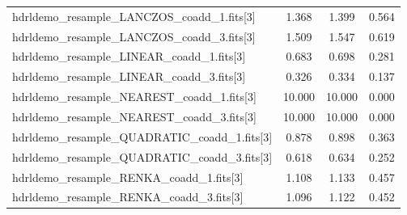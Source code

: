 \begin{table}[H]
\begin{center}
\begin{tabular}{|l|c|c|c|}
hdrldemo\_resample\_LANCZOS\_coadd\_1.fits[3]              & 1.368       & 1.399      & 0.564         \\
hdrldemo\_resample\_LANCZOS\_coadd\_3.fits[3]              & 1.509       & 1.547      & 0.619         \\
hdrldemo\_resample\_LINEAR\_coadd\_1.fits[3]               & 0.683       & 0.698      & 0.281         \\
hdrldemo\_resample\_LINEAR\_coadd\_3.fits[3]               & 0.326       &0.334      & 0.137         \\
hdrldemo\_resample\_NEAREST\_coadd\_1.fits[3]              & 10.000      & 10.000     & 0.000         \\
hdrldemo\_resample\_NEAREST\_coadd\_3.fits[3]              & 10.000      & 10.000     & 0.000         \\
hdrldemo\_resample\_QUADRATIC\_coadd\_1.fits[3]            & 0.878       & 0.898      & 0.363         \\
hdrldemo\_resample\_QUADRATIC\_coadd\_3.fits[3]            & 0.618       & 0.634     & 0.252         \\
hdrldemo\_resample\_RENKA\_coadd\_1.fits[3]                & 1.108       & 1.133      & 0.457         \\
hdrldemo\_resample\_RENKA\_coadd\_3.fits[3]                & 1.096       & 1.122      & 0.452         \\
\bottomrule

\end{tabular}	
\end{center}																											

\label{tab:errors_fixed}
\end{table}



